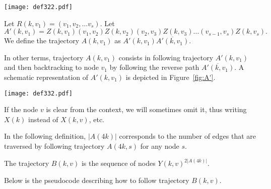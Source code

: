 \documentclass [11pt] {article}
\begin{document}
\begin{figure*}[httb!]
	\begin{center}
	\texttt{[image: def322.pdf]}
	\caption{{A schematic representation of trajectory $Z(k,v)$ which is made up of a sequence of consecutive trajectories $Y(i,v)$ from $i=1$ to $i=k$.}}
	\label{fig:Z}
	\end{center}
\end{figure*}


\begin{definition}
\label{def:A}
Let $R(k,v_1)=(v_1,v_2,\dots v_s)$. Let $$A'(k,v_1)=Z(k,v_1)(v_1,v_2)Z(k,v_2)(v_2,v_3)Z(k,v_3)\dots (v_{s-1},v_s) Z(k,v_s).$$ We define
the trajectory $A(k,v_1)$ as $A'(k,v_1)\overline{A'(k,v_1)}$. 
\end{definition}
\newpage
{In other terms, trajectory $A(k,v_1)$ consists in following trajectory $A'(k,v_1)$ and then backtracking to node $v_1$ by following the reverse path $\overline{A'(k,v_1)}$. A schematic representation of $A'(k,v_1)$ is depicted in Figure~\ref{fig:A'}.}

\begin{figure*}[httb!]
	\begin{center}
	\texttt{[image: def332.pdf]}
	\caption{{A schematic representation of trajectory $A'(k,v_1)$ which consists in following trajectory $R(k,v_1)=(v_1,v_2,\dots v_s)$ with the following insertions: for all $i<s$, before going from node $v_i$ to $v_{i+1}$ the agent follows trajectory $Z(k,v_i)$.}}
	\label{fig:A'}
	\end{center}
\end{figure*}


{If the node $v$ is clear from the context, we will sometimes omit it, thus writing $X(k)$ instead of $X(k,v)$, etc.}

{In the following definition, $|A(4k)|$ corresponds to the number of edges that are traversed by following trajectory $A(4k,s)$ for any node $s$.} 
\begin{definition}
\label{def:B}
The trajectory $B(k,v)$ is the sequence of nodes $Y(k,v)^{2|A(4k)|}$. 
\end{definition}

{Below is the pseudocode describing how to follow trajectory $B(k,v)$.}

\begin{center}
\end{center} 
\end{document}
